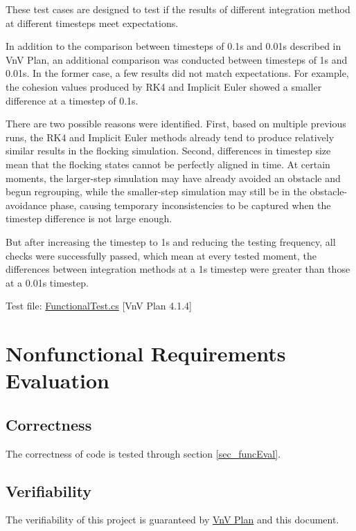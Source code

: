 \documentclass[12pt, titlepage]{article}
\begin{document}
These test cases are designed to test if the results of different integration 
method at different timesteps meet expectations. 

In addition to the comparison between timesteps of 0.1s and 0.01s described 
in VnV Plan, an additional comparison was conducted between timesteps of 1s 
and 0.01s. In the former case, a few results did not match expectations. 
For example, the cohesion values produced by RK4 and Implicit Euler showed a 
smaller difference at a timestep of 0.1s. 

There are two possible reasons were identified. First, based on multiple 
previous runs, the RK4 and Implicit Euler methods already tend to produce 
relatively similar results in the flocking simulation. Second, differences 
in timestep size mean that the flocking states cannot be perfectly aligned 
in time. At certain moments, the larger-step simulation may have already 
avoided an obstacle and begun regrouping, while the smaller-step simulation 
may still be in the obstacle-avoidance phase, causing temporary 
inconsistencies to be captured when the timestep difference is not large 
enough. 

But after increasing the timestep to 1s and reducing the testing 
frequency, all checks were successfully passed, which mean at every tested 
moment, the differences between integration methods at a 1s timestep were 
greater than those at a 0.01s timestep.

Test file: \href{https://github.com/Mei0725/FlockingSimulator/blob/main/src/Assets/Tests/FunctionalTest/FunctionalTest.cs}{FunctionalTest.cs} [VnV Plan 4.1.4]

\section{Nonfunctional Requirements Evaluation}

\subsection{Correctness}

The correctness of code is tested through section \ref{sec_funcEval}.
		
\subsection{Verifiability}

The verifiability of this project is guaranteed by 
\href{https://mei0725.github.io/FlockingSimulator/VnVPlan/VnVPlan.pdf}{VnV Plan}
and this document.
\end{document}
